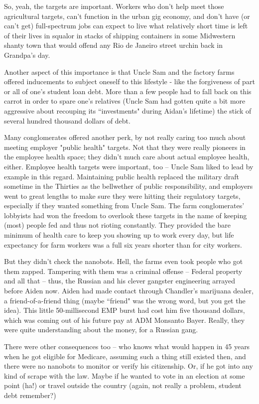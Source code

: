 \documentclass[11pt]{book}
\begin{document}
	So, yeah, the targets are important. Workers who don't help meet those agricultural targets, can't function in the urban gig economy, and don't have (or can't get) full-spectrum jobs can expect to live what relatively short time is left of their lives in squalor in stacks of shipping containers in some Midwestern shanty town that would offend any Rio de Janeiro street urchin back in Grandpa's day.
	
	Another aspect of this importance is that Uncle Sam and the factory farms offered inducements to subject oneself to this lifestyle - like the forgiveness of part or all of one's student loan debt. More than a few people had to fall back on this carrot in order to spare one's relatives (Uncle Sam had gotten quite a bit more aggressive about recouping its ``investments" during Aidan's lifetime) the stick of several hundred thousand dollars of debt.
	
	Many conglomerates offered another perk, by not really caring too much about meeting employer "public health" targets. Not that they were really pioneers in the employee health space; they didn't much care about actual employee health, either. Employee health targets were important, too -- Uncle Sam liked to lead by example in this regard. Maintaining public health replaced the military draft sometime in the Thirties as the bellwether of public responsibility, and employers went to great lengths to make sure they were hitting their regulatory targets, especially if they wanted something from Uncle Sam. The farm conglomerates' lobbyists had won the freedom to overlook these targets in the name of keeping (most) people fed and thus not rioting constantly. They provided the bare minimum of health care to keep you showing up to work every day, but life expectancy for farm workers was a full six years shorter than for city workers. 
	
	But they didn't check the nanobots. Hell, the farms even took people who got them zapped. Tampering with them was a criminal offense -- Federal property and all that -- thus, the Russian and his clever gangster engineering arrayed before Aiden now. Aiden had made contact through Chandler's marijuana dealer, a friend-of-a-friend thing (maybe ``friend" was the wrong word, but you get the idea). This little 50-millisecond EMP burst had cost him five thousand dollars, which was coming out of his future pay at ADM Monsanto Bayer. Really, they were quite understanding about the money, for a Russian gang. 
	
	There were other consequences too -- who knows what would happen in 45 years when he got eligible for Medicare, assuming such a thing still existed then, and there were no nanobots to monitor or verify his citizenship. Or, if he got into any kind of scrape with the law. Maybe if he wanted to vote in an election at some point (ha!) or travel outside the country (again, not really a problem, student debt remember?)
	
\end{document}

